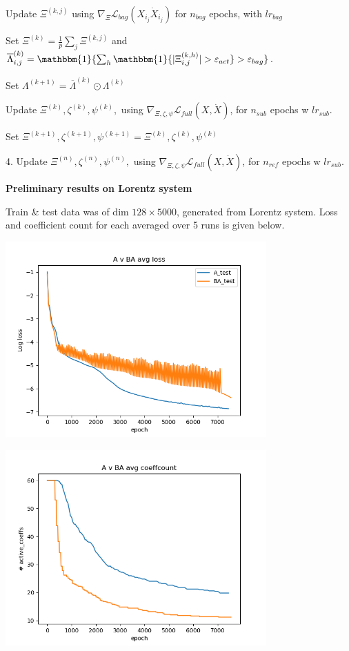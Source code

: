 \documentclass[11pt]{article}
\newcommand{\indi}{\mathbbm{1}}
\renewcommand{\epsilon}{\varepsilon}
\newcommand{\tb}{\textbf}
\begin{document}
\hspace{30 pt}  Update $\Xi^{(k,j)}$ using $\nabla_{\Xi} \mathcal{L}_{bag}(X_{i_j}  \dot{X}_{i_j})$ for $n_{bag}$ epochs,  with $lr_{bag}$


\hspace{15 pt} Set $\Xi^{(k)} = \frac{1}{p} \sum_{j}\Xi^{(k,j)}$ and 
$ \overline{\Lambda}^{(k)} _{i,j} =\indi\{\sum_h\indi \{|\Xi^{(k,h)}_{i,j}|  > \epsilon_{act}\} > \epsilon_{bag} \}$.  


\hspace{15 pt} Set $\Lambda^{(k+1)}  =  \overline{\Lambda}^{(k)} \odot\Lambda^{(k)}$


\hspace{15 pt} Update $\Xi^{(k)},  \zeta^{(k)},  \psi^{(k)},$ using 
$\nabla_{\Xi, \zeta, \psi}\mathcal{L}_{full}(X,\dot{X})$,  for $n_{sub}$ epochs w $lr_{sub}$.


\hspace{15 pt}  Set $\Xi^{(k+1)}, \zeta^{(k+1)}, \psi^{(k+1)} = \Xi^{(k)}, \zeta^{(k)}, \psi^{(k)}$

4.  Update $\Xi^{(n)},  \zeta^{(n)},  \psi^{(n)},$ using 
$\nabla_{\Xi, \zeta, \psi}\mathcal{L}_{full}(X,\dot{X})$,  for $n_{ref}$ epochs w $lr_{sub}$.


\pagebreak

\centerline{\tb{Preliminary results on Lorentz system}}

Train \& test data was of dim $128 \times 5000$, generated from Lorentz system.
 Loss and coefficient count for each averaged over 5 runs is given below.


\includegraphics[width=100mm]{avg_loss.png}



\includegraphics[width=100mm]{avg_coeff.png}
\end{document}
